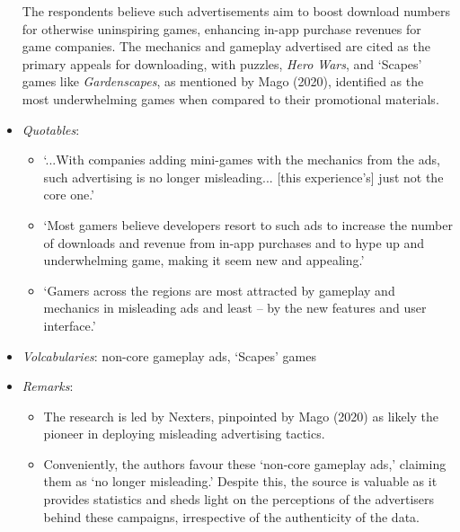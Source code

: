 \documentclass[a4paper, 12pt, mla]{homework}
\begin{document}
\begin{abibliography}
\begin{itemize}
			The respondents believe such advertisements aim to boost download numbers for otherwise uninspiring games, enhancing in-app purchase revenues for game companies. 
			The mechanics and gameplay advertised are cited as the primary appeals for downloading, with puzzles, \textit{Hero Wars}, and `Scapes' games like \textit{Gardenscapes}, as mentioned by Mago (2020), identified as the most underwhelming games when compared to their promotional materials.
		\item \textit{Quotables}:
			\begin{itemize}
				\item `...With companies adding mini-games with the mechanics from the ads, such advertising is no longer misleading... [this experience's] just not the core one.'
				\item `Most gamers believe developers resort to such ads to increase the number of downloads and revenue from in-app purchases and to hype up and underwhelming game, making it seem new and appealing.'
				\item `Gamers across the regions are most attracted by gameplay and mechanics in misleading ads and least -- by the new features and user interface.'
			\end{itemize}
		\item \textit{Volcabularies}:
			non-core gameplay ads, `Scapes' games
		\item \textit{Remarks}: 
			\begin{itemize}
				\item The research is led by Nexters, pinpointed by Mago (2020) as likely the pioneer in deploying misleading advertising tactics.
			\item Conveniently, the authors favour these `non-core gameplay ads,' claiming them as `no longer misleading.' 
				Despite this, the source is valuable as it provides statistics and sheds light on the perceptions of the advertisers behind these campaigns, irrespective of the authenticity of the data.
			\end{itemize}
		\end{itemize}
		

\end{abibliography}
\end{document}
